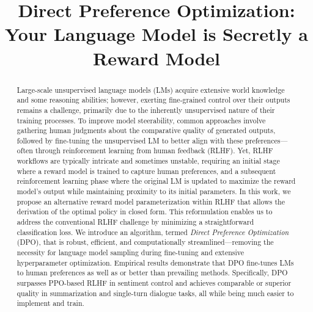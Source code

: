 \title{Direct Preference Optimization: Your Language Model is Secretly a Reward Model}

\begin{abstract}
Large-scale unsupervised language models (LMs) acquire extensive world knowledge and some reasoning abilities; however, exerting fine-grained control over their outputs remains a challenge, primarily due to the inherently unsupervised nature of their training processes. To improve model steerability, common approaches involve gathering human judgments about the comparative quality of generated outputs, followed by fine-tuning the unsupervised LM to better align with these preferences—often through reinforcement learning from human feedback (RLHF). Yet, RLHF workflows are typically intricate and sometimes unstable, requiring an initial stage where a reward model is trained to capture human preferences, and a subsequent reinforcement learning phase where the original LM is updated to maximize the reward model’s output while maintaining proximity to its initial parameters. In this work, we propose an alternative reward model parameterization within RLHF that allows the derivation of the optimal policy in closed form. This reformulation enables us to address the conventional RLHF challenge by minimizing a straightforward classification loss. We introduce an algorithm, termed \textit{Direct Preference Optimization} (DPO), that is robust, efficient, and computationally streamlined—removing the necessity for language model sampling during fine-tuning and extensive hyperparameter optimization. Empirical results demonstrate that DPO fine-tunes LMs to human preferences as well as or better than prevailing methods. Specifically, DPO surpasses PPO-based RLHF in sentiment control and achieves comparable or superior quality in summarization and single-turn dialogue tasks, all while being much easier to implement and train.
\end{abstract}

